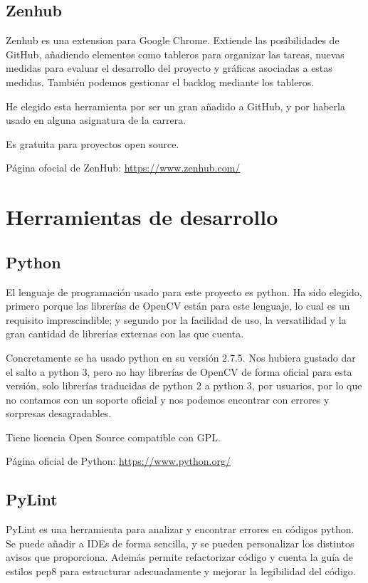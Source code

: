 \subsection{Zenhub}
Zenhub es una extension para Google Chrome. Extiende las posibilidades de GitHub, añadiendo elementos como tableros para organizar las tareas, nuevas medidas para evaluar el desarrollo del proyecto y gráficas asociadas a estas medidas. También podemos gestionar el backlog mediante los tableros.

He elegido esta herramienta por ser un gran añadido a GitHub, y por haberla usado en alguna asignatura de la carrera.  

Es gratuita para proyectos open source.

Página ofocial de ZenHub: \url{https://www.zenhub.com/}


\section{Herramientas de desarrollo}

\subsection{Python}
El lenguaje de programación usado para este proyecto es python. Ha sido elegido, primero porque las librerías de OpenCV están para este lenguaje, lo cual es un requisito imprescindible; y segundo por la facilidad de uso, la versatilidad y la gran cantidad de librerías externas con las que cuenta.

Concretamente se ha usado python en su versión 2.7.5.
Nos hubiera gustado dar el salto a python 3, pero no hay librerías de OpenCV de forma oficial para esta versión, solo librerías traducidas de python 2 a python 3, por usuarios, por lo que no contamos con un soporte oficial y nos podemos encontrar con errores y sorpresas desagradables.

Tiene licencia Open Source compatible con GPL.

Página oficial de Python: \url{https://www.python.org/}

\subsection{PyLint}
PyLint es una herramienta para analizar y encontrar errores en códigos python. Se puede añadir a IDEs de forma sencilla, y se pueden personalizar los distintos avisos que proporciona. 
Además permite refactorizar código y cuenta la guía de estilos pep8\cite{pep8} para estructurar adecuadamente y mejorar la legibilidad del código.

